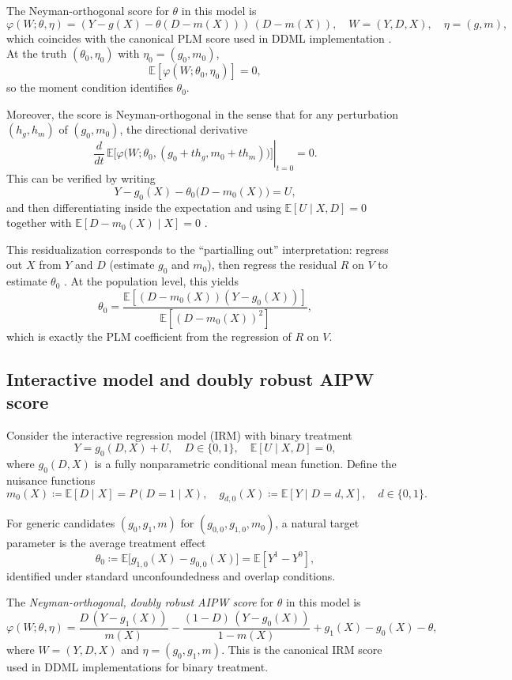 \documentclass [11pt]{article}
\theoremstyle{plain}
\theoremstyle{definition}
\theoremstyle{remark}
\newcommand{\1}{\bm{1}}
\newcommand{\E}{\mathbb{E}}
\begin{document}
\begin{appendices}
The Neyman-orthogonal score for $\theta$ in this model is
\[
\varphi(W; \theta, \eta) = (Y - g(X) - \theta (D - m(X)))\,(D - m(X)), \quad W = (Y,D,X), \quad \eta = (g,m),
\]
which coincides with the canonical PLM score used in DDML implementation \citep[Sec.~2]{chernozhukov2018dml,doubleml2022}. At the truth $(\theta_0,\eta_0)$ with $\eta_0 = (g_0,m_0)$,
\[
\E[\varphi(W; \theta_0, \eta_0)] = 0,
\]
so the moment condition identifies $\theta_0$.

Moreover, the score is Neyman-orthogonal in the sense that for any perturbation $(h_g, h_m)$ of $(g_0,m_0)$, the directional derivative
\[
\left. \frac{d}{dt}\,\E\big[\varphi\big(W; \theta_0, (g_0 + t h_g, m_0 + t h_m)\big)\big] \right|_{t=0} = 0.
\]
This can be verified by writing
\[
Y - g_0(X) - \theta_0\bigl(D - m_0(X)\bigr) = U,
\]
and then differentiating inside the expectation and using $\E[U \mid X,D]=0$ together with $\E[D - m_0(X) \mid X]=0$ \citep[Sec.~2]{chernozhukov2018dml}.

This residualization corresponds to the ``partialling out'' interpretation: regress out $X$ from $Y$ and $D$ (estimate $g_0$ and $m_0$), then regress the residual $R$ on $V$ to estimate $\theta_0$ \citep[Fig.~1c]{doubleml2022}. At the population level, this yields
\[
\theta_0 = \frac{\E[(D-m_0(X))(Y-g_0(X))]}{\E[(D-m_0(X))^2]},
\]
which is exactly the PLM coefficient from the regression of $R$ on $V$.

\subsection{Interactive model and doubly robust AIPW score}
\label{sec:theory_irm}

Consider the interactive regression model (IRM) with binary treatment
\[
Y = g_0(D,X) + U,\quad D \in \{0,1\},\quad \E[U \mid X,D] = 0,
\]
where \(g_0(D,X)\) is a fully nonparametric conditional mean function.
Define the nuisance functions
\[
m_0(X) \coloneqq \E[D \mid X] = P(D=1 \mid X),\quad g_{d,0}(X) \coloneqq \E[Y \mid D=d,X],\quad d \in \{0,1\}.
\]

For generic candidates \((g_0,g_1,m)\) for \((g_{0,0},g_{1,0},m_0)\), a natural target parameter is the average treatment effect
\[
\theta_0 \coloneqq \E\bigl[g_{1,0}(X) - g_{0,0}(X)\bigr] = \E[Y^1 - Y^0],
\]
identified under standard unconfoundedness and overlap conditions.

The \emph{Neyman-orthogonal, doubly robust AIPW score} for \(\theta\) in this model is
\[
\varphi(W; \theta, \eta) = \frac{D\,(Y - g_1(X))}{m(X)} - \frac{(1-D)\,(Y - g_0(X))}{1 - m(X)} + g_1(X) - g_0(X) - \theta,
\]
where \(W = (Y,D,X)\) and \(\eta = (g_0,g_1,m)\).
This is the canonical IRM score used in DDML implementations for binary treatment.


\end{appendices}
\end{document}
